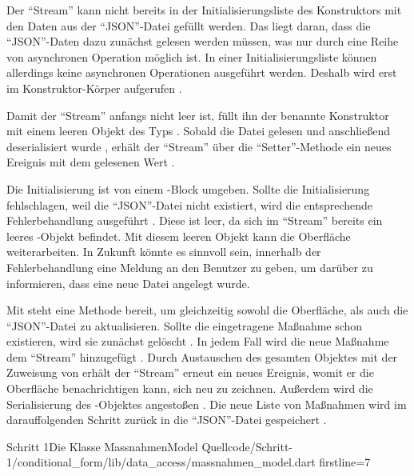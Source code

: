 Der \enquote{Stream} kann nicht bereits in der Initialisierungsliste des Konstruktors mit den Daten aus der \enquote{JSON}-Datei gefüllt werden.
Das liegt daran, dass die \enquote{JSON}-Daten dazu zunächst gelesen werden müssen, was nur durch eine Reihe von asynchronen Operation möglich ist.
In einer Initialisierungsliste können allerdings keine asynchronen Operationen ausgeführt werden.
Deshalb wird  erst im Konstruktor-Körper aufgerufen .

Damit der \enquote{Stream} anfangs nicht leer ist, füllt ihn der benannte Konstruktor  mit einem leeren Objekt des Typs  .
Sobald die Datei gelesen  und anschließend deserialisiert wurde , erhält der \enquote{Stream} über die \enquote{Setter}-Methode  ein neues Ereignis mit dem gelesenen Wert .

Die Initialisierung ist von einem -Block umgeben.
Sollte die Initialisierung fehlschlagen, weil die \enquote{JSON}-Datei nicht existiert, wird die entsprechende Fehlerbehandlung ausgeführt .
Diese ist leer, da sich im \enquote{Stream} bereits ein leeres -Objekt  befindet.
Mit diesem leeren Objekt kann die Oberfläche weiterarbeiten.
In Zukunft könnte es sinnvoll sein, innerhalb der Fehlerbehandlung eine Meldung an den Benutzer zu geben, um darüber zu informieren, dass eine neue Datei angelegt wurde.

Mit   steht eine Methode bereit, um gleichzeitig  sowohl die Oberfläche,  als auch die \enquote{JSON}-Datei zu aktualisieren.
Sollte die eingetragene Maßnahme schon existieren, wird sie zunächst gelöscht .
In jedem Fall wird die neue Maßnahme dem \enquote{Stream} hinzugefügt .
Durch Austauschen des gesamten Objektes mit der Zuweisung von   erhält der \enquote{Stream} erneut ein neues Ereignis, womit er die Oberfläche benachrichtigen kann,
sich neu zu zeichnen.
Außerdem wird die Serialisierung des -Objektes angestoßen .
Die neue Liste von Maßnahmen wird im darauffolgenden Schritt zurück in die \enquote{JSON}-Datei gespeichert .

\begin{alexlisting}{Schritt 1}{Die Klasse MassnahmenModel}
  {Quellcode/Schritt-1/conditional_form/lib/data_access/massnahmen_model.dart}
  {firstline=7}
  \label{lst:Schritt1KlasseMassnahmenModel}
\end{alexlisting}
